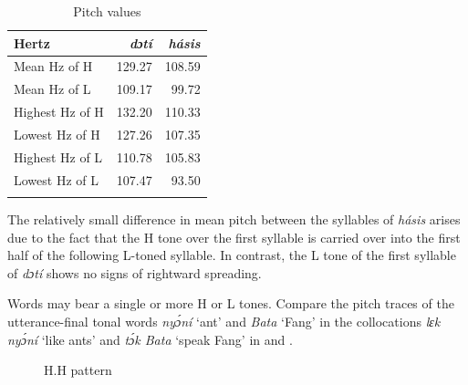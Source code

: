 \begin{table}
\caption{Pitch values}
\label{tab:key:3.1}

\begin{tabularx}{.5\textwidth}{Xrr}
\lsptoprule
Hertz & \itshape dɔtí & \itshape hásis\\
\midrule
Mean Hz of H    & 129.27 & 108.59\\
Mean Hz of L    & 109.17 & 99.72\\
Highest Hz of H & 132.20 & 110.33\\
Lowest Hz of H  & 127.26 & 107.35\\
Highest Hz of L & 110.78 & 105.83\\
Lowest Hz of L  & 107.47 & 93.50\\
\lspbottomrule
\end{tabularx}
\end{table}

The relatively small difference in mean pitch between the syllables of \textit{hásis} arises due to the fact that the H tone over the first syllable is carried over into the first half of the following L-toned syllable. In contrast, the L tone of the first syllable of \textit{dɔtí} shows no signs of rightward spreading. 

Words may bear a single or more H or L tones. Compare the pitch traces of the utterance-final tonal words \textit{nyɔ́ní} ‘ant’ and \textit{Bata} ‘Fang’ in the collocations \textit{lɛk nyɔ́ní} ‘like ants’ and \textit{tɔ́k Bata} ‘speak Fang’ in  and .


\begin{figure}
\caption{H.H pattern} 
\label{fig:key:3.7}
\end{figure}

